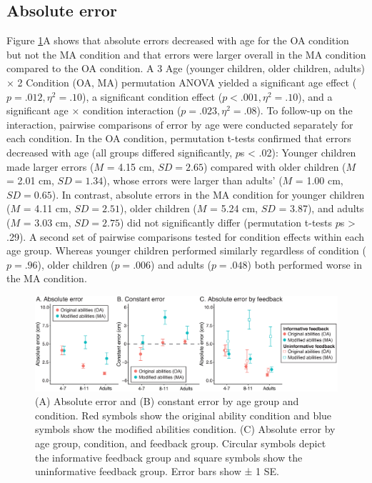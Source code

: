 \documentclass[a4paper,man,natbib,floatsintext,noextraspace]{apa6}
\begin{document}
\subsection{Absolute error}

Figure \ref{fig:error}A shows that absolute errors decreased with age for the OA condition but not the MA condition and that errors were larger overall in the MA condition compared to the OA condition. A 3 Age (younger children, older children, adults) × 2 Condition (OA, MA) permutation ANOVA yielded a significant age effect ($p = .012, \eta^{2} = .10$), a significant condition effect ($p < .001, \eta^{2} = .10$), and a significant age × condition interaction ($p = .023, \eta^{2} = .08$). To follow-up on the interaction, pairwise comparisons of error by age were conducted separately for each condition. In the OA condition, permutation t-tests confirmed that errors decreased with age (all groups differed significantly, $p$s < .02): Younger children made larger errors ($M$ = 4.15 cm, $SD = 2.65$) compared with older children ($M$ = 2.01 cm, $SD = 1.34$), whose errors were larger than adults’ ($M$ = 1.00 cm, $SD = 0.65$). In contrast, absolute errors in the MA condition for younger children ($M$ = 4.11 cm, $SD = 2.51$), older children ($M$ = 5.24 cm, $SD$ = 3.87), and adults ($M$ = 3.03 cm, $SD = 2.75$) did not significantly differ (permutation t-tests $p$s > .29). A second set of pairwise comparisons tested for condition effects within each age group. Whereas younger children performed similarly regardless of condition ($p = .96$), older children ($p = .006$) and adults ($p = .048$) both performed worse in the MA condition.

\begin{figure}[htb!]
\centering
\includegraphics[width=1\textwidth]{error.eps}
\caption{\label{fig:error}(A) Absolute error and (B) constant error by age group and condition. Red symbols show the original ability condition and blue symbols show the modified abilities condition. (C) Absolute error by age group, condition, and feedback group. Circular symbols depict the informative feedback group and square symbols show the uninformative feedback group. Error bars show ± 1 SE.}
\end{figure}
\end{document}
